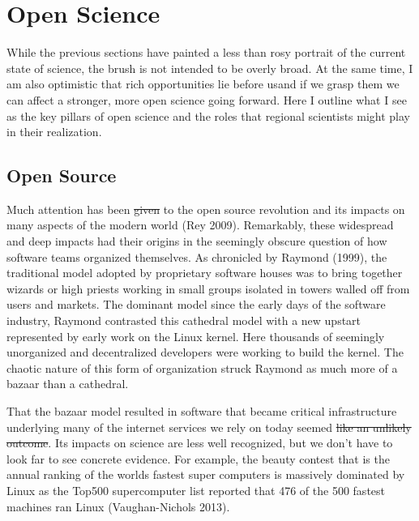 \documentclass{article}
\providecommand{\DIFadd}[1]{{\protect\color{blue}\uwave{#1}}} %
\providecommand{\DIFdel}[1]{{\protect\color{red}\sout{#1}}}                      %
\providecommand{\DIFaddbegin}{} %
\providecommand{\DIFaddend}{} %
\providecommand{\DIFdelbegin}{} %
\providecommand{\DIFdelend}{} %
\begin{document}
\section{Open Science}\label{open-science}

While the previous sections \DIFaddbegin \DIFadd{of this address }\DIFaddend have painted a less than
rosy portrait of the current state of science, the brush is not intended
to be overly broad. At the same time, I am also optimistic that rich
opportunities lie before us\DIFaddbegin \DIFadd{, }\DIFaddend and if we grasp them we can affect a
stronger, more open science going forward. Here I outline what I see as
the key pillars of open science and the roles that regional scientists
might play in their realization.

\subsection{Open Source}\label{open-source}

Much attention has been \DIFdelbegin \DIFdel{given }\DIFdelend \DIFaddbegin \DIFadd{paid }\DIFaddend to the open source revolution and its
impacts on many aspects of the modern world (Rey 2009). Remarkably,
these widespread and deep impacts had their origins in the seemingly
obscure question of how software teams organized themselves. As
chronicled by Raymond (1999), the traditional model adopted by
proprietary software houses was to bring together wizards or high
priests working in small groups isolated in towers walled off from users
and markets. The dominant model since the early days of the software
industry, Raymond contrasted this cathedral model with a new upstart
represented by early work on the Linux kernel. Here thousands of
seemingly unorganized and decentralized developers were working to build
the kernel. The chaotic nature of this form of organization struck
Raymond as much more of a bazaar than a cathedral.

That the bazaar model resulted in software that became critical
infrastructure underlying many of the internet services we rely on today
seemed \DIFdelbegin \DIFdel{like an unlikely outcome}\DIFdelend \DIFaddbegin \DIFadd{surprising}\DIFaddend . Its impacts on science are less well recognized, but
we don't have to look far to see concrete evidence. For example, the
beauty contest that is the annual ranking of the worlds fastest super
computers is massively dominated by Linux as the Top500 supercomputer
list reported that 476 of the 500 fastest machines ran Linux
(Vaughan-Nichols 2013).
\end{document}
